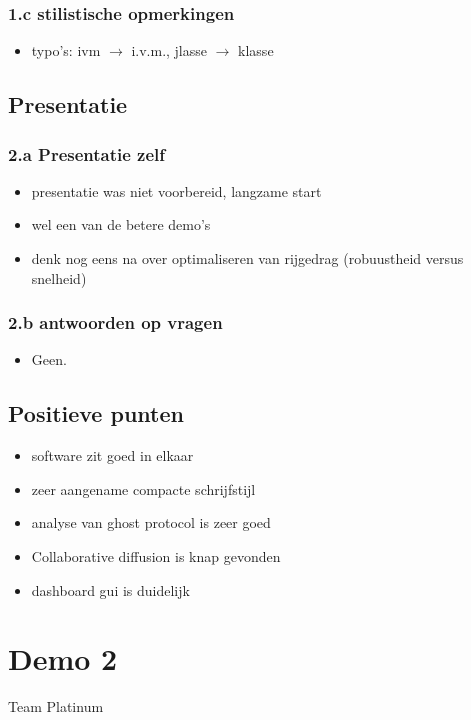 \documentclass[12pt,a4paper]{report}
\begin{document}
   \subsubsection{1.c stilistische opmerkingen}

\begin{itemize}
	\item typo's: ivm $\rightarrow$ i.v.m., jlasse $\rightarrow$ klasse
\end{itemize}

\subsection{Presentatie}

	\subsubsection{2.a Presentatie zelf}
\begin{itemize}
 \item presentatie was niet voorbereid, langzame start
 \item wel een van de betere demo's
 \item denk nog eens na over optimaliseren van rijgedrag (robuustheid versus snelheid)
\end{itemize}

     \subsubsection{2.b antwoorden op vragen}
\begin{itemize}
	\item     Geen.
 
\end{itemize}
\subsection{ Positieve punten}

\begin{itemize}
 \item software zit goed in elkaar
 \item zeer aangename compacte schrijfstijl
 \item analyse van ghost protocol is zeer goed
 \item Collaborative diffusion is knap gevonden
 \item dashboard gui is duidelijk
\end{itemize}

\section{Demo 2}
\begin{center}
Team Platinum
\end{center}
\end{document}

